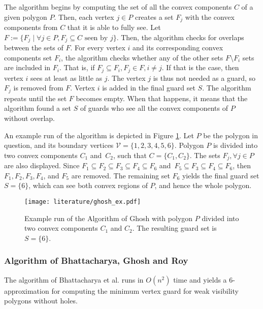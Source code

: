 The algorithm begins by computing the set of all the convex components $C$ of a given polygon $P$. Then, each vertex $j \in P$ creates a set $F_j$ with the convex components from $C$ that it is able to fully see. Let $F := \{F_j \mid \forall j \in P, F_j \subseteq C \text{ seen by } j\}$. Then, the algorithm checks for overlaps between the sets of $F$. For every vertex $i$ and its corresponding convex components set $F_i$, the algorithm checks whether any of the other sets $F \setminus F_i$ sets are included in $F_i$. That is, if $F_j \subseteq F_i, F_j \in F, i \neq j$. If that is the case, then  vertex $i$ sees at least as little as $j$. The vertex $j$ is thus not needed as a guard, so $F_j$ is removed from $F$. Vertex $i$ is added in the final guard set $S$. The algorithm repeats until the set $F$ becomes empty. When that happens, it means that the algorithm found a set $S$ of guards who see all the convex components of $P$ without overlap.


An example run of the algorithm is depicted in Figure \ref{fig:ghosh}. Let $P$ be the polygon in question, and its boundary vertices $\mathcal V = \{1, 2, 3, 4, 5, 6\}$. Polygon $P$ is divided into two convex components $C_1$ and~$C_2$, such that $C = \{C_1, C_2\}$. The sets $F_j, \forall j \in P$ are also displayed. Since $F_1 \subseteq F_2 \subseteq F_3 \subseteq F_4 \subseteq F_6$ and~$F_5 \subseteq F_3 \subseteq F_4 \subseteq F_6$, then $F_1, F_2, F_3, F_4$, and $F_5$ are removed. The remaining set $F_6$ yields the final guard set $S = \{6\}$, which can see both convex regions of $P$, and hence the whole polygon.

\begin{figure}[h!]
    \centering
    \texttt{[image: literature/ghosh\_ex.pdf]}
    \caption{Example run of the Algorithm of Ghosh \cite{GHOSH2010718} with polygon $P$ divided into two convex components $C_1$ and $C_2$. The resulting guard set is $S = \{6\}$.}
    \label{fig:ghosh}
\end{figure}

\newpage
\subsubsection{Algorithm of Bhattacharya, Ghosh and Roy}
The algorithm of Bhattacharya et al. \cite{bhattacharya2016approximability} runs in $O(n^2)$ time and yields a 6-approximation for computing the minimum vertex guard for weak visibility polygons without holes. 

